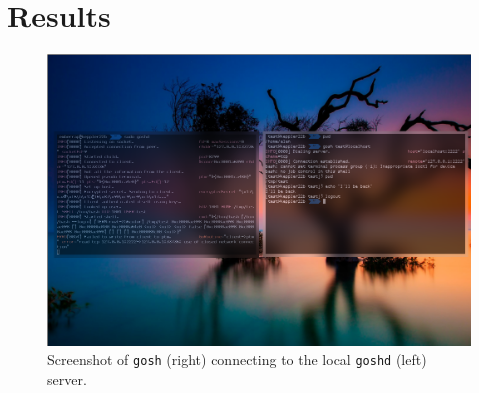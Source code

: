 \documentclass[10pt,a4paper,titlepage,twoside,english,final]{zhawreprt}
\begin{document}
\chapter{Results}\label{chp:Results}
\begin{figure}[ht]
\includegraphics[width=\textwidth]{ohmygosh}
\caption{Screenshot of \texttt{gosh} (right) connecting to the local \texttt{goshd} (left) server.}
\label{fig:OhMyGoshScrot}
\end{figure}
\end{document}
